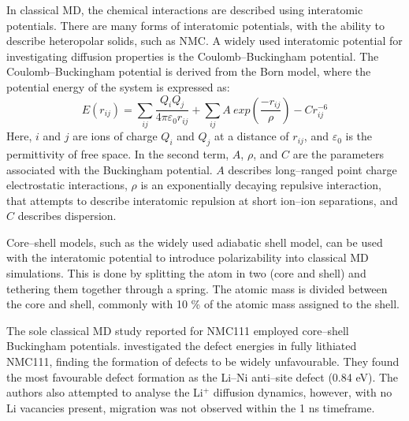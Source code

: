 \documentclass[journal=jacsat,manuscript=article]{achemso}
\begin{document}
In classical MD, the chemical interactions are described using interatomic potentials.\cite{plimpton1995computational,monticelli2013force,sutmann2002classical,brooks2021classical} 
There are many forms of interatomic potentials, with the ability to describe heteropolar solids, such as NMC. 
A widely used interatomic potential for investigating diffusion properties is the Coulomb--Buckingham potential.\cite{buckingham_classical_1938} 
The Coulomb--Buckingham potential is derived from the Born model\cite{born_1932, mayer_1932}, where the potential energy of the system is expressed as:
%
\begin{equation}
    E(r_{ij}) =  \sum_{ij} \frac{Q_i Q_j}{4\pi \varepsilon_0 r_{ij}} + \sum_{ij} A \ exp(\frac{-r_{ij}}{\rho}) - Cr_{ij}^{-6}
\end{equation}
%
Here, $i$ and $j$ are ions of charge $Q_i$ and $Q_j$ at a distance of $r_{ij}$, and $\varepsilon_0$ is the permittivity of free space.
In the second term, $A$, $\rho$, and $C$ are the parameters associated with the Buckingham potential.
$A$ describes long--ranged point charge electrostatic interactions, $\rho$ is an exponentially decaying repulsive interaction, that attempts to describe interatomic repulsion at short ion--ion separations, and $C$ describes dispersion.

Core--shell models, such as the widely used adiabatic shell model,\cite{Mitchell_1993} can be used with the interatomic potential to introduce polarizability into classical MD simulations.\cite{escribano2017enhancing,Hart1998,Fisher2010,Kerisit2014,He2019}
This is done by splitting the atom in two (core and shell) and tethering them together through a spring.
The atomic mass is divided between the core and shell, commonly with 10 \% of the atomic mass assigned to the shell.\cite{PLIMPTON19951,todorov2006dl_poly_3}

The sole classical MD study reported for NMC111 employed core--shell Buckingham potentials.\cite{Lee_and_Park_2012} \citeauthor{Lee_and_Park_2012} investigated the defect energies in fully lithiated NMC111, finding the formation of defects to be widely unfavourable.
They found the most favourable defect formation as the Li--Ni anti--site defect (0.84 eV).
The authors also attempted to analyse the Li$^{+}$ diffusion dynamics, however, with no Li vacancies present, migration was not observed within the 1 ns timeframe.
\end{document}
